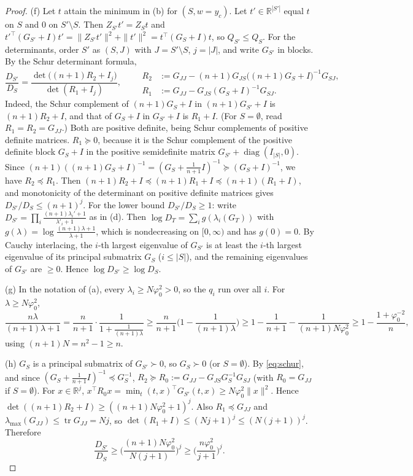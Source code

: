 \documentclass[11pt]{article}
\theoremstyle{remark}
\newcommand{\R}{\mathbb R}
\newcommand{\tr}{\operatorname{tr}}
\begin{document}
\begin{proof}
(f) Let $t$ attain the minimum in (b) for $(S,w=y_c)$. Let $t'\in\R^{|S'|}$ equal $t$ on $S$ and $0$ on $S'\setminus S$. Then $Z_{S'}t'=Z_St$ and $t'^\top(G_{S'}+I)t'=\|Z_{S'}t'\|^2+\|t'\|^2=t^\top(G_S+I)t$, so $Q_{S'}\le Q_S$. For the determinants, order $S'$ as $(S,J)$ with $J=S'\setminus S$, $j=|J|$, and write $G_{S'}$ in blocks. By the Schur determinant formula,
\begin{equation}\label{eq:schur}
\frac{D_{S'}}{D_S}=\frac{\det\big((n+1)R_2+I_j\big)}{\det(R_1+I_j)},\qquad
\begin{aligned}
R_2&:=G_{JJ}-(n+1)G_{JS}\big((n+1)G_S+I\big)^{-1}G_{SJ},\\
R_1&:=G_{JJ}-G_{JS}(G_S+I)^{-1}G_{SJ}.
\end{aligned}
\end{equation}
Indeed, the Schur complement of $(n+1)G_S+I$ in $(n+1)G_{S'}+I$ is $(n+1)R_2+I$, and that of $G_S+I$ in $G_{S'}+I$ is $R_1+I$. (For $S=\emptyset$, read $R_1=R_2=G_{JJ}$.) Both are positive definite, being Schur complements of positive definite matrices. $R_1\succeq0$, because it is the Schur complement of the positive definite block $G_S+I$ in the positive semidefinite matrix $G_{S'}+\operatorname{diag}(I_{|S|},0)$. Since $(n+1)((n+1)G_S+I)^{-1}=(G_S+\frac1{n+1}I)^{-1}\succeq(G_S+I)^{-1}$, we have $R_2\preceq R_1$. Then $(n+1)R_2+I\preceq(n+1)R_1+I\preceq(n+1)(R_1+I)$, and monotonicity of the determinant on positive definite matrices gives $D_{S'}/D_S\le(n+1)^j$. For the lower bound $D_{S'}/D_S\ge1$: write $D_{S'}=\prod_{i}\frac{(n+1)\lambda_i'+1}{\lambda'_i+1}$ as in (d). Then $\log D_T=\sum_i g(\lambda_i(G_T))$ with $g(\lambda)=\log\frac{(n+1)\lambda+1}{\lambda+1}$, which is nondecreasing on $[0,\infty)$ and has $g(0)=0$. By Cauchy interlacing, the $i$-th largest eigenvalue of $G_{S'}$ is at least the $i$-th largest eigenvalue of its principal submatrix $G_S$ ($i\le|S|$), and the remaining eigenvalues of $G_{S'}$ are $\ge0$. Hence $\log D_{S'}\ge\log D_S$.

(g) In the notation of (a), every $\lambda_i\ge N\varphi_0^2>0$, so the $q_i$ run over all $i$. For $\lambda\ge N\varphi_0^2$,
\[
\frac{n\lambda}{(n+1)\lambda+1}=\frac n{n+1}\cdot\frac1{1+\frac1{(n+1)\lambda}}\ge\frac n{n+1}\Big(1-\frac1{(n+1)\lambda}\Big)\ge1-\frac1{n+1}-\frac1{(n+1)N\varphi_0^2}\ge1-\frac{1+\varphi_0^{-2}}n,
\]
using $(n+1)N=n^2-1\ge n$.

(h) $G_S$ is a principal submatrix of $G_{S'}\succ0$, so $G_S\succ0$ (or $S=\emptyset$). By \eqref{eq:schur}, and since $(G_S+\frac1{n+1}I)^{-1}\preceq G_S^{-1}$, $R_2\succeq R_0:=G_{JJ}-G_{JS}G_S^{-1}G_{SJ}$ (with $R_0=G_{JJ}$ if $S=\emptyset$). For $x\in\R^j$, $x^\top R_0x=\min_{t}(t,x)^\top G_{S'}(t,x)\ge N\varphi_0^2\|x\|^2$. Hence $\det((n+1)R_2+I)\ge((n+1)N\varphi_0^2+1)^j$. Also $R_1\preceq G_{JJ}$ and $\lambda_{\max}(G_{JJ})\le\tr G_{JJ}=Nj$, so $\det(R_1+I)\le(Nj+1)^j\le(N(j+1))^j$. Therefore
\[
\frac{D_{S'}}{D_S}\ge\Big(\frac{(n+1)N\varphi_0^2}{N(j+1)}\Big)^j\ge\Big(\frac{n\varphi_0^2}{j+1}\Big)^j .
\]


\end{proof}
\end{document}
